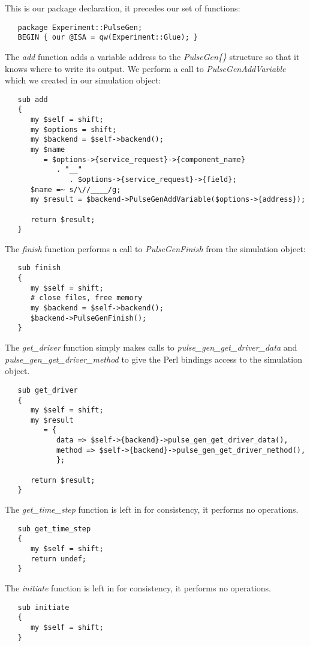 \documentclass[12pt]{article}
\begin{document}
This is our package declaration, it precedes our set of functions:
\begin{verbatim}
   package Experiment::PulseGen;
   BEGIN { our @ISA = qw(Experiment::Glue); }
\end{verbatim}
The {\it add} function adds a variable address to the {\it PulseGen\{\}} structure so that it knows where to write its output. We perform a call to {\it PulseGenAddVariable} which we created in our simulation object:
\begin{verbatim}
   sub add
   {
      my $self = shift;
      my $options = shift;
      my $backend = $self->backend();
      my $name
         = $options->{service_request}->{component_name}
            . "__"
               . $options->{service_request}->{field};
      $name =~ s/\//____/g;
      my $result = $backend->PulseGenAddVariable($options->{address});

      return $result;
   }
\end{verbatim}
The {\it finish} function performs a call to {\it PulseGenFinish} from the simulation object:
\begin{verbatim}
   sub finish
   {
      my $self = shift;
      # close files, free memory
      my $backend = $self->backend();
      $backend->PulseGenFinish();
   }
\end{verbatim}
The {\it get\_driver} function simply makes calls to {\it pulse\_gen\_get\_driver\_data} and {\it pulse\_gen\_get\_driver\_method} to give the Perl bindings access to the simulation object.
\begin{verbatim}
   sub get_driver
   {
      my $self = shift;
      my $result
         = {
            data => $self->{backend}->pulse_gen_get_driver_data(),
            method => $self->{backend}->pulse_gen_get_driver_method(),
            };

      return $result;
   }
\end{verbatim}
The {\it get\_time\_step} function is left in for consistency, it performs no operations.
\begin{verbatim}
   sub get_time_step
   {
      my $self = shift;
      return undef;
   }
\end{verbatim}
The {\it initiate} function is left in for consistency, it performs no operations.
\begin{verbatim}
   sub initiate
   {
      my $self = shift;
   }
\end{verbatim}
\end{document}
